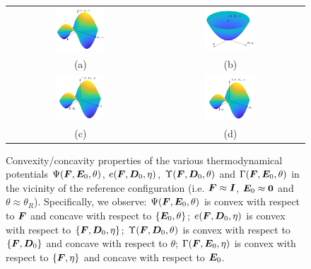 \begin{figure}[htpb!]	
	\centering
	\begin{tabular}{cc}
	\includegraphics[width=0.35\textwidth]{Figures/InkScape/convexity_psi}&
\includegraphics[width=0.35\textwidth]{Figures/InkScape/convexity_e}\\
%
(a)  &  (b)\\
%
\includegraphics[width=0.35\textwidth]{Figures/InkScape/convexity_upsilon}&
\includegraphics[width=0.35\textwidth]{Figures/InkScape/convexity_gamma}	\\
%	
(c)  &  (d)
	\end{tabular}
	\vspace{-2mm}
	\caption{Convexity/concavity properties of the various thermodynamical potentials $\Psi(\boldsymbol{F},\boldsymbol{E}_0,\theta)$, $e(\boldsymbol{F},\boldsymbol{D}_0,\eta)$, $\Upsilon(\boldsymbol{F},\boldsymbol{D}_0,\theta)$ and $\Gamma(\boldsymbol{F},\boldsymbol{E}_0,\theta)$ in the vicinity of the reference configuration (i.e. $\boldsymbol{F}\approx \boldsymbol{I}$, $\boldsymbol{E}_0\approx \boldsymbol{0}$ and $\theta\approx \theta_R$). Specifically, we observe: $\Psi(\boldsymbol{F},\boldsymbol{E}_0,\theta)$ is convex with respect to $\boldsymbol{F}$ and concave with respect to $\{\boldsymbol{E}_0,\theta\}$; $e(\boldsymbol{F},\boldsymbol{D}_0,\eta)$ is convex with respect to $\{\boldsymbol{F},\boldsymbol{D}_0,\eta\}$; $\Upsilon(\boldsymbol{F},\boldsymbol{D}_0,\theta)$ is convex with respect to $\{\boldsymbol{F},\boldsymbol{D}_0\}$ and concave with respect to $\theta$; $\Gamma(\boldsymbol{F},\boldsymbol{E}_0,\eta)$ is convex with respect to $\{\boldsymbol{F},\eta\}$ and concave with respect to $\boldsymbol{E}_0$.}
	\label{fig:convexity}
\end{figure}

